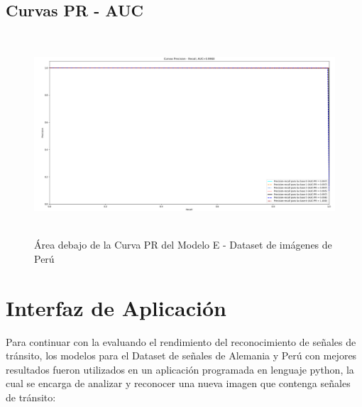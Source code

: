 		\subsection{Curvas PR - AUC}  
					\begin{figure}[H]
						\includegraphics[width=1\textwidth, height=7.5cm]{images/desarrollo/testResults/peru/PR_curve_modelE} 
						\begin{center}
						\caption{\small{Área debajo de la Curva PR del Modelo E - Dataset de imágenes de Perú}}
						{\small{\fontsize{10}{16.8}\selectfont {Fuente: Elaboración propia}}}
						\end{center}
						\vspace{-1.5em}
					\end{figure}
	\newpage
	\section{Interfaz de Aplicación}
		
		Para continuar con la evaluando el rendimiento del reconocimiento de señales de tránsito, los modelos para el Dataset de señales de Alemania y Perú con mejores resultados fueron utilizados en un aplicación programada en lenguaje python, la cual se encarga de analizar y reconocer una nueva imagen que contenga señales de tránsito:

